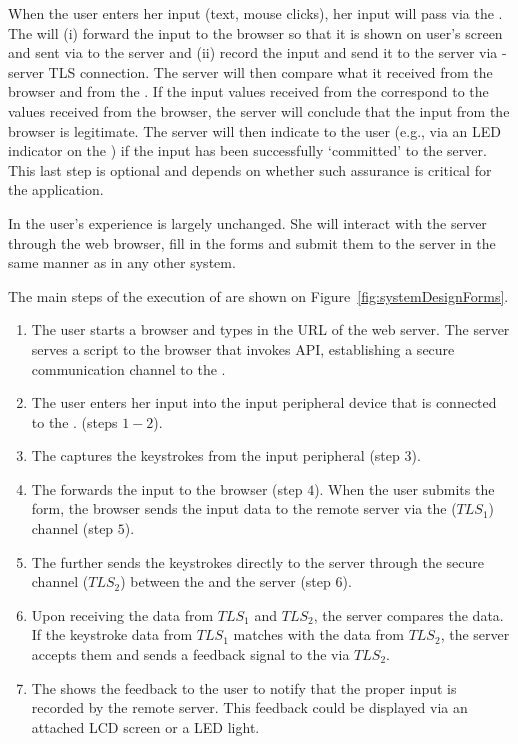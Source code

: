 When the user enters her input (text, mouse clicks), her input will pass via the \device. The \device will (i) forward the input to the browser so that it is shown on user's screen and sent via \https to the server and (ii) record the input and send it to the server via \device-server TLS connection. The server will then compare what it received from the browser and from the \device. If the input values received from the \device correspond to the values received from the browser, the server will conclude that the input from the browser is legitimate. The server will then indicate to the user (e.g., via an LED indicator on the \device) if the input has been successfully `committed' to the server. This last step is optional and depends on whether such assurance is critical for the application. 

In \name the user's experience is largely unchanged. She will interact with the server through the web browser, fill in the forms and submit them to the server in the same manner as in any other system. 

The main steps of the execution of \name are shown on Figure~\ref{fig:systemDesignForms}. 

\begin{enumerate}
\item The user starts a browser and types in the URL of the web server. The server serves a script to the browser that invokes \webusb API, establishing a secure communication channel to the \device. 
  \item The user enters her input into the input peripheral device that is connected to the \device. (steps $1-2$).
  \item The \device captures the keystrokes from the input peripheral (step $3$).
  \item The \device forwards the input to the browser (step $4$). When the user submits the form,  the browser sends the input data to the remote server via the \https ($TLS_1$) channel (step $5$).
  \item The \device further sends the keystrokes directly to the server through the secure channel ($TLS_2$) between the \device and the server (step $6$). 
  \item Upon receiving the data from $TLS_1$ and $TLS_2$, the server compares the data. If the keystroke data from $TLS_1$ matches with the data from $TLS_2$, the server accepts them and sends a feedback signal to the \device via $TLS_2$.
  \item The \device shows the feedback to the user to notify that the proper input is recorded by the remote server. This feedback could be displayed via an attached LCD screen or a LED light.
\end{enumerate}  


